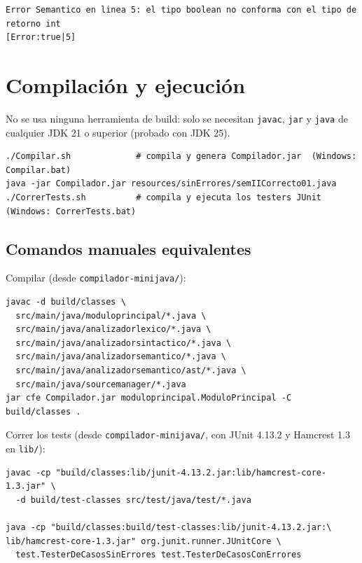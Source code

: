 \documentclass[11pt,a4paper]{article}
\begin{document}
{\footnotesize
\begin{verbatim}
Error Semantico en linea 5: el tipo boolean no conforma con el tipo de retorno int
[Error:true|5]
\end{verbatim}
}

\section{Compilación y ejecución}

No se usa ninguna herramienta de build: solo se necesitan \texttt{javac},
\texttt{jar} y \texttt{java} de cualquier JDK 21 o superior (probado con JDK 25).

{\footnotesize
\begin{verbatim}
./Compilar.sh             # compila y genera Compilador.jar  (Windows: Compilar.bat)
java -jar Compilador.jar resources/sinErrores/semIICorrecto01.java
./CorrerTests.sh          # compila y ejecuta los testers JUnit  (Windows: CorrerTests.bat)
\end{verbatim}
}

\subsection{Comandos manuales equivalentes}

Compilar (desde \texttt{compilador-minijava/}):

{\footnotesize
\begin{verbatim}
javac -d build/classes \
  src/main/java/moduloprincipal/*.java \
  src/main/java/analizadorlexico/*.java \
  src/main/java/analizadorsintactico/*.java \
  src/main/java/analizadorsemantico/*.java \
  src/main/java/analizadorsemantico/ast/*.java \
  src/main/java/sourcemanager/*.java
jar cfe Compilador.jar moduloprincipal.ModuloPrincipal -C build/classes .
\end{verbatim}
}

Correr los tests (desde \texttt{compilador-minijava/}, con JUnit 4.13.2 y Hamcrest
1.3 en \texttt{lib/}):

{\footnotesize
\begin{verbatim}
javac -cp "build/classes:lib/junit-4.13.2.jar:lib/hamcrest-core-1.3.jar" \
  -d build/test-classes src/test/java/test/*.java

java -cp "build/classes:build/test-classes:lib/junit-4.13.2.jar:\
lib/hamcrest-core-1.3.jar" org.junit.runner.JUnitCore \
  test.TesterDeCasosSinErrores test.TesterDeCasosConErrores
\end{verbatim}
}
\end{document}
